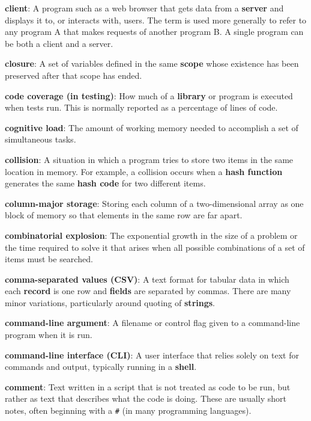 \documentclass[krantzl]{krantz}
\newcommand{\glosskey}[1]{\textbf{#1}}
\begin{document}
\noindent \textbf{\glosskey{client}}: 
A program such as a web browser that gets data from a \glosskey{server} and displays it to, or interacts with, users. The term is used more generally to refer to any program A that makes requests of another program B. A single program can be both a client and a server.


\noindent \textbf{\glosskey{closure}}: 
A set of variables defined in the same \glosskey{scope} whose existence has been preserved after that scope has ended.


\noindent \textbf{\glosskey{code coverage (in testing)}}: 
How much of a \glosskey{library} or program is executed when tests run. This is normally reported as a percentage of lines of code.


\noindent \textbf{\glosskey{cognitive load}}: 
The amount of working memory needed to accomplish a set of simultaneous tasks.


\noindent \textbf{\glosskey{collision}}: 
A situation in which a program tries to store two items in the same location in memory. For example, a collision occurs when a \glosskey{hash function} generates the same \glosskey{hash code} for two different items.


\noindent \textbf{\glosskey{column-major storage}}: 
Storing each column of a two-dimensional array as one block of memory so that elements in the same row are far apart.


\noindent \textbf{\glosskey{combinatorial explosion}}: 
The exponential growth in the size of a problem or the time required to solve it that arises when all possible combinations of a set of items must be searched.


\noindent \textbf{\glosskey{comma-separated values} (CSV)}: 
A text format for tabular data in which each \glosskey{record} is one row and \glosskey{fields} are separated by commas. There are many minor variations, particularly around quoting of \glosskey{strings}.


\noindent \textbf{\glosskey{command-line argument}}: 
A filename or control flag given to a command-line program when it is run.


\noindent \textbf{\glosskey{command-line interface} (CLI)}: 
A user interface that relies solely on text for commands and output, typically running in a \glosskey{shell}.


\noindent \textbf{\glosskey{comment}}: 
Text written in a script that is not treated as code to be run, but rather as text that describes what the code is doing. These are usually short notes, often beginning with a \texttt{\#} (in many programming languages).
\end{document}
